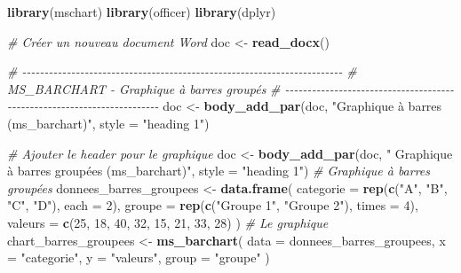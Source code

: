 \documentclass[
]{article}
\newenvironment{Shaded}{\begin{snugshade}}{\end{snugshade}}
\newcommand{\AttributeTok}[1]{\textcolor[rgb]{0.13,0.29,0.53}{#1}}
\newcommand{\CommentTok}[1]{\textcolor[rgb]{0.56,0.35,0.01}{\textit{#1}}}
\newcommand{\DecValTok}[1]{\textcolor[rgb]{0.00,0.00,0.81}{#1}}
\newcommand{\FunctionTok}[1]{\textcolor[rgb]{0.13,0.29,0.53}{\textbf{#1}}}
\newcommand{\NormalTok}[1]{#1}
\newcommand{\OtherTok}[1]{\textcolor[rgb]{0.56,0.35,0.01}{#1}}
\newcommand{\StringTok}[1]{\textcolor[rgb]{0.31,0.60,0.02}{#1}}
\begin{document}
\begin{Shaded}
\begin{Highlighting}[]
\FunctionTok{library}\NormalTok{(mschart)}
\FunctionTok{library}\NormalTok{(officer)}
\FunctionTok{library}\NormalTok{(dplyr)}

\CommentTok{\# Créer un nouveau document Word}
\NormalTok{doc }\OtherTok{\textless{}{-}} \FunctionTok{read\_docx}\NormalTok{()}


\CommentTok{\# {-}{-}{-}{-}{-}{-}{-}{-}{-}{-}{-}{-}{-}{-}{-}{-}{-}{-}{-}{-}{-}{-}{-}{-}{-}{-}{-}{-}{-}{-}{-}{-}{-}{-}{-}{-}{-}{-}{-}{-}{-}{-}{-}{-}{-}{-}{-}{-}{-}{-}{-}{-}{-}{-}{-}{-}{-}{-}{-}{-}{-}{-}{-}{-}{-}{-}{-}{-}{-}{-}{-}{-}}
\CommentTok{\# MS\_BARCHART {-} Graphique à barres groupés}
\CommentTok{\# {-}{-}{-}{-}{-}{-}{-}{-}{-}{-}{-}{-}{-}{-}{-}{-}{-}{-}{-}{-}{-}{-}{-}{-}{-}{-}{-}{-}{-}{-}{-}{-}{-}{-}{-}{-}{-}{-}{-}{-}{-}{-}{-}{-}{-}{-}{-}{-}{-}{-}{-}{-}{-}{-}{-}{-}{-}{-}{-}{-}{-}{-}{-}{-}{-}{-}{-}{-}{-}{-}{-}{-}}
\NormalTok{doc }\OtherTok{\textless{}{-}} \FunctionTok{body\_add\_par}\NormalTok{(doc, }\StringTok{"Graphique à barres (ms\_barchart)"}\NormalTok{, }\AttributeTok{style =} \StringTok{"heading 1"}\NormalTok{)}

\CommentTok{\# Ajouter le header pour le graphique}
\NormalTok{doc }\OtherTok{\textless{}{-}} \FunctionTok{body\_add\_par}\NormalTok{(doc, }\StringTok{" Graphique à barres groupées (ms\_barchart)"}\NormalTok{, }\AttributeTok{style =} \StringTok{"heading 1"}\NormalTok{)}
\CommentTok{\# Graphique à barres groupées}
\NormalTok{donnees\_barres\_groupees }\OtherTok{\textless{}{-}} \FunctionTok{data.frame}\NormalTok{(}
  \AttributeTok{categorie =} \FunctionTok{rep}\NormalTok{(}\FunctionTok{c}\NormalTok{(}\StringTok{"A"}\NormalTok{, }\StringTok{"B"}\NormalTok{, }\StringTok{"C"}\NormalTok{, }\StringTok{"D"}\NormalTok{), }\AttributeTok{each =} \DecValTok{2}\NormalTok{),}
  \AttributeTok{groupe =} \FunctionTok{rep}\NormalTok{(}\FunctionTok{c}\NormalTok{(}\StringTok{"Groupe 1"}\NormalTok{, }\StringTok{"Groupe 2"}\NormalTok{), }\AttributeTok{times =} \DecValTok{4}\NormalTok{),}
  \AttributeTok{valeurs =} \FunctionTok{c}\NormalTok{(}\DecValTok{25}\NormalTok{, }\DecValTok{18}\NormalTok{, }\DecValTok{40}\NormalTok{, }\DecValTok{32}\NormalTok{, }\DecValTok{15}\NormalTok{, }\DecValTok{21}\NormalTok{, }\DecValTok{33}\NormalTok{, }\DecValTok{28}\NormalTok{)}
\NormalTok{)}
\CommentTok{\# Le graphique}
\NormalTok{chart\_barres\_groupees }\OtherTok{\textless{}{-}} \FunctionTok{ms\_barchart}\NormalTok{(}
  \AttributeTok{data =}\NormalTok{ donnees\_barres\_groupees,}
  \AttributeTok{x =} \StringTok{"categorie"}\NormalTok{,}
  \AttributeTok{y =} \StringTok{"valeurs"}\NormalTok{,}
  \AttributeTok{group =} \StringTok{"groupe"}
\NormalTok{)}


\end{Highlighting}
\end{Shaded}
\end{document}
